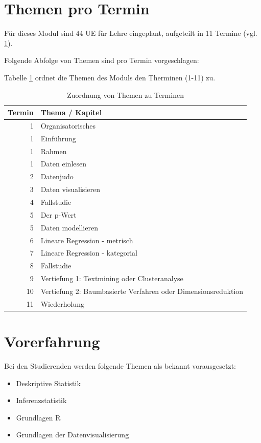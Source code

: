 \documentclass[12pt,ngerman,]{book}
\providecommand{\tightlist}{%
  \setlength{\itemsep}{0pt}\setlength{\parskip}{0pt}}
\begin{document}
\section{Themen pro Termin}\label{themen-pro-termin}

Für dieses Modul sind 44 UE für Lehre eingeplant, aufgeteilt in 11
Termine (vgl. \ref{tab:termin-themen}).

Folgende Abfolge von Themen sind pro Termin vorgeschlagen:

Tabelle \ref{tab:termin-themen} ordnet die Themen des Moduls den
Therminen (1-11) zu.

\begin{table}

\caption{\label{tab:termin-themen}Zuordnung von Themen zu Terminen}
\centering
\begin{tabular}[t]{r|l}
\hline
Termin & Thema / Kapitel\\
\hline
1 & Organisatorisches\\
\hline
1 & Einführung\\
\hline
1 & Rahmen\\
\hline
1 & Daten einlesen\\
\hline
2 & Datenjudo\\
\hline
3 & Daten visualisieren\\
\hline
4 & Fallstudie\\
\hline
5 & Der p-Wert\\
\hline
5 & Daten modellieren\\
\hline
6 & Lineare Regression - metrisch\\
\hline
7 & Lineare Regression - kategorial\\
\hline
8 & Fallstudie\\
\hline
9 & Vertiefung 1: Textmining oder Clusteranalyse\\
\hline
10 & Vertiefung 2: Baumbasierte Verfahren oder Dimensionsreduktion\\
\hline
11 & Wiederholung\\
\hline
\end{tabular}
\end{table}

\section{Vorerfahrung}\label{vorerfahrung}

Bei den Studierenden werden folgende Themen als bekannt vorausgesetzt:

\begin{itemize}
\tightlist
\item
  Deskriptive Statistik
\item
  Inferenzstatistik
\item
  Grundlagen R
\item
  Grundlagen der Datenvisualisierung
\end{itemize}
\end{document}
